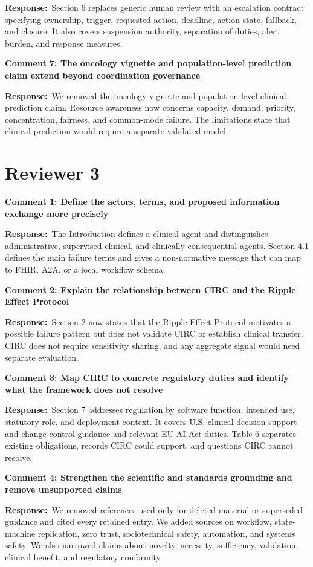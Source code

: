 \documentclass[11pt]{article}
\newcommand{\reviewer}[1]{\section*{#1}}
\newcommand{\comment}[1]{\par\medskip\noindent\textbf{#1}\par}
\newcommand{\response}{\noindent\textbf{Response:}\ }
\begin{document}
\response Section 6 replaces generic human review with an escalation contract specifying ownership,
trigger, requested action, deadline, action state, fallback, and closure. It also covers suspension
authority, separation of duties, alert burden, and response measures.

\comment{Comment 7: The oncology vignette and population-level prediction claim extend beyond coordination governance}

\response We removed the oncology vignette and population-level clinical prediction claim. Resource
awareness now concerns capacity, demand, priority, concentration, fairness, and common-mode failure.
The limitations state that clinical prediction would require a separate validated model.

\newpage
\reviewer{Reviewer 3}

\comment{Comment 1: Define the actors, terms, and proposed information exchange more precisely}

\response The Introduction defines a clinical agent and distinguishes administrative, supervised
clinical, and clinically consequential agents. Section 4.1 defines the main failure terms and gives a
non-normative message that can map to FHIR, A2A, or a local workflow schema.

\comment{Comment 2: Explain the relationship between CIRC and the Ripple Effect Protocol}

\response Section 2 now states that the Ripple Effect Protocol motivates a possible failure pattern
but does not validate CIRC or establish clinical transfer. CIRC does not require sensitivity sharing,
and any aggregate signal would need separate evaluation.

\comment{Comment 3: Map CIRC to concrete regulatory duties and identify what the framework does not resolve}

\response Section 7 addresses regulation by software function, intended use, statutory role, and
deployment context. It covers U.S. clinical decision support and change-control guidance and relevant
EU AI Act duties. Table 6 separates existing obligations, records CIRC could support, and questions
CIRC cannot resolve.

\comment{Comment 4: Strengthen the scientific and standards grounding and remove unsupported claims}

\response We removed references used only for deleted material or superseded guidance and cited every
retained entry. We added sources on workflow, state-machine replication, zero trust, sociotechnical
safety, automation, and systems safety. We also narrowed claims about novelty, necessity,
sufficiency, validation, clinical benefit, and regulatory conformity.
\end{document}
